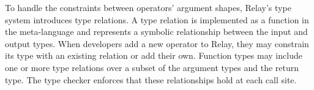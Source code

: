         To handle the constraints between operators' argument shapes, Relay's type system
          introduces type relations.
        A type relation is implemented as a function in the
          meta-language and represents a symbolic relationship between
          the input and output types.
        When developers add a new operator to Relay, they may constrain its
          type with an existing relation or add their own.
        Function types may include
          one or more type relations over a subset of the argument types and the return type.
        The type checker enforces that these relationships hold at each call site.
